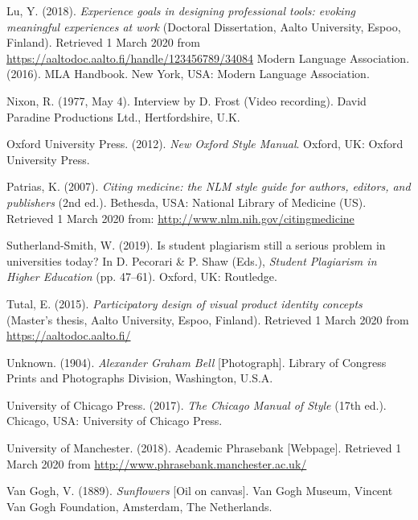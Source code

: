\documentclass[english, 12pt, a4paper, biz, utf8, a-2b, online]{aaltothesis}
\begin{document}
\vspace{1ex}
\noindent
Lu, Y. (2018). 
\textit{Experience goals in designing professional tools: evoking meaningful 
	experiences at work} 
(Doctoral Dissertation, Aalto University, Espoo, Finland). 
Retrieved 1 March 2020 from 
\url{https://aaltodoc.aalto.fi/handle/123456789/34084} 
Modern Language Association. (2016). MLA Handbook. New York, USA: Modern 
Language Association.

\vspace{1ex}
\noindent
Nixon, R. (1977, May 4). Interview by D. Frost (Video recording). 
David Paradine Productions Ltd., Hertfordshire, U.K.

\vspace{1ex}
\noindent
Oxford University Press. (2012). 
\textit{New Oxford Style Manual}. Oxford, UK: Oxford University Press.

\vspace{1ex}
\noindent
Patrias, K. (2007). 
\textit{Citing medicine: the NLM style guide for authors, editors, and 
	publishers} 
(2nd ed.). Bethesda, USA: National Library of Medicine (US). 
Retrieved 1 March 2020 from: \url{http://www.nlm.nih.gov/citingmedicine}

\vspace{1ex}
\noindent
Sutherland-Smith, W. (2019). Is student plagiarism still a serious problem in 
universities today? In D. Pecorari \& P. Shaw (Eds.), 
\textit{Student Plagiarism in Higher Education} (pp. 47--61). 
Oxford, UK: Routledge.

\vspace{1ex}
\noindent
Tutal, E. (2015). 
\textit{Participatory design of visual product identity concepts} 
(Master’s thesis, Aalto University, Espoo, Finland). 
Retrieved 1 March 2020 from \url{https://aaltodoc.aalto.fi/}

\vspace{1ex}
\noindent
Unknown. (1904). \textit{Alexander Graham Bell} [Photograph]. 
Library of Congress Prints and Photographs Division, Washington, U.S.A.

\vspace{1ex}
\noindent
University of Chicago Press. (2017). \textit{The Chicago Manual of Style} 
(17th ed.). Chicago, USA: University of Chicago Press.

\vspace{1ex}
\noindent
University of Manchester. (2018). Academic Phrasebank [Webpage]. 
Retrieved 1 March 2020 from \url{http://www.phrasebank.manchester.ac.uk/}

\vspace{1ex}
\noindent
Van Gogh, V. (1889). \textit{Sunflowers} [Oil on canvas]. 
Van Gogh Museum, Vincent Van Gogh Foundation, Amsterdam, The Netherlands.
\end{document}
